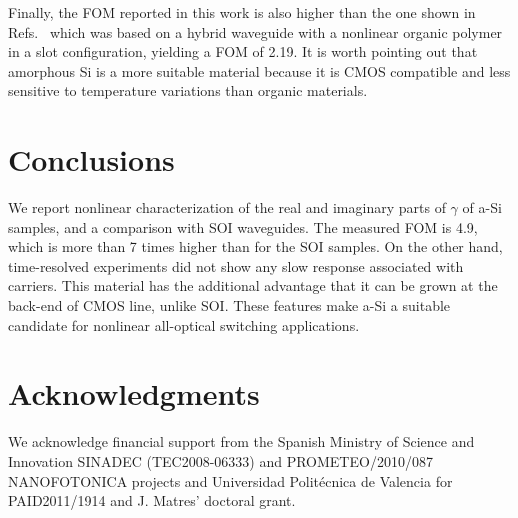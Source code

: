 Finally, the FOM reported in this work is also higher than the one shown in Refs.~\cite{Vallaitis2009,Koos2009} which was based on a hybrid waveguide with a nonlinear organic polymer in a slot configuration, yielding a FOM of 2.19. It is worth pointing out that amorphous Si is a more suitable material because it is CMOS compatible and less sensitive to temperature variations than organic materials.

\section{Conclusions}
We report nonlinear characterization of the real and imaginary parts of $\gamma$ of a-Si samples, and a comparison with SOI waveguides.
The measured FOM is 4.9, which is more than 7 times higher than for the SOI samples.  On the other hand, time-resolved experiments did not show any slow response associated with carriers. This material has the additional advantage that it can be grown at the back-end of CMOS line, unlike SOI.
These features make a-Si a suitable candidate for nonlinear all-optical switching applications.



\section*{Acknowledgments}
We acknowledge financial support from the Spanish Ministry of Science and Innovation SINADEC (TEC2008-06333) and PROMETEO/2010/087 NANOFOTONICA projects and Universidad Polit\'ecnica de Valencia for PAID2011/1914 and J. Matres' doctoral grant.

